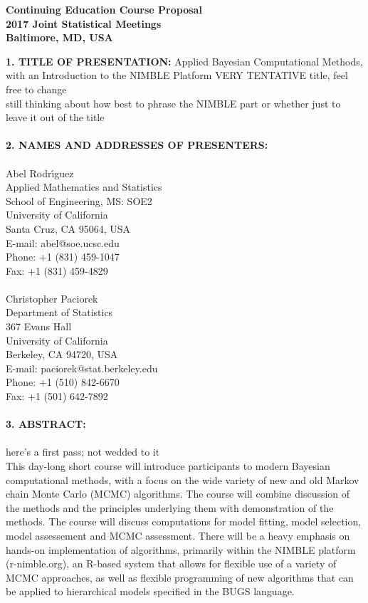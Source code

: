 \documentclass[11pt]{article}
\begin{document}
\begin{center}
{\Large {\bf Continuing Education Course Proposal}}\\
{\large {\bf 2017 Joint Statistical Meetings}}\\
{\large {\bf Baltimore, MD, USA
}}
\end{center}


\vspace{0.5cm}

\noindent
{\large {\bf 1. TITLE OF PRESENTATION:}}
Applied Bayesian Computational Methods, with an Introduction to the NIMBLE Platform {\color{red} VERY TENTATIVE title, feel free to change}\\
{\color{blue} still thinking about how best to phrase the NIMBLE part or whether just to leave it out of the title}\\
\\
{\large {\bf 2. NAMES AND ADDRESSES OF PRESENTERS:}}\\
\\
Abel Rodr\'{\i}guez\\
Applied Mathematics and Statistics\\
School of Engineering, MS: SOE2\\         
University of California\\      
Santa Cruz, CA 95064, USA\\
E-mail: abel@soe.ucsc.edu\\
Phone: +1 (831) 459-1047\\
Fax: +1 (831) 459-4829\\
\\
Christopher Paciorek \\              
Department of Statistics\\
367 Evans Hall \\
University of California\\      
Berkeley, CA 94720, USA\\
E-mail: paciorek@stat.berkeley.edu\\
Phone: +1 (510) 842-6670\\
Fax: +1 (501) 642-7892
\\
\\
{\large {\bf 3. ABSTRACT:}}\\
\\
{\color{blue} here's a first pass; not wedded to it}\\
This day-long short course will introduce participants to modern Bayesian computational methods, with a focus on the wide variety of new and old Markov chain Monte Carlo (MCMC) algorithms. The course will combine discussion of the methods and the principles underlying them with demonstration of the methods. The course will discuss computations for model fitting, model selection, model assessement and MCMC assessment. There will be a heavy emphasis on hands-on implementation of algorithms, primarily within the NIMBLE platform (r-nimble.org), an R-based system that allows for flexible use of a variety of MCMC approaches, as well as flexible programming of new algorithms that can be applied to hierarchical models specified in the BUGS language. 
\end{document}
